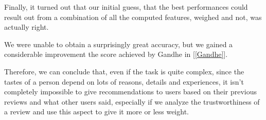 Finally, it turned out that our initial guess, that the best performances could result out from a combination of all the computed features, weighed and not, was actually right.

We were unable to obtain a surprisingly great accuracy, but we gained a considerable improvement \wrt the score achieved by Gandhe in [\ref{Gandhe}].

Therefore, we can conclude that, even if the task is quite complex, since the tastes of a person depend on lots of reasons, details and experiences, it isn't completely impossible to give recommendations to users based on their previous reviews and what other users said, especially if we analyze the trustworthiness of a review and use this aspect to give it more or less weight.
